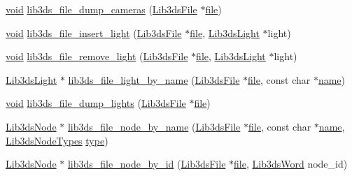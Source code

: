 \begin{DoxyCompactItemize}
\item 
\hyperlink{group___u_a_v_objects_plugin_ga444cf2ff3f0ecbe028adce838d373f5c}{void} \hyperlink{group__file_gaec85bcbf180366cd627e9ee90b9d6e53}{lib3ds\-\_\-file\-\_\-dump\-\_\-cameras} (\hyperlink{struct_lib3ds_file}{Lib3ds\-File} $\ast$\hyperlink{uavobjecttemplate_8m_a97c04efa65bcf0928abf9260bc5cbf46}{file})
\item 
\hyperlink{group___u_a_v_objects_plugin_ga444cf2ff3f0ecbe028adce838d373f5c}{void} \hyperlink{group__file_ga402b166af774fa3b07c6ae252d8699b6}{lib3ds\-\_\-file\-\_\-insert\-\_\-light} (\hyperlink{struct_lib3ds_file}{Lib3ds\-File} $\ast$\hyperlink{uavobjecttemplate_8m_a97c04efa65bcf0928abf9260bc5cbf46}{file}, \hyperlink{struct_lib3ds_light}{Lib3ds\-Light} $\ast$light)
\item 
\hyperlink{group___u_a_v_objects_plugin_ga444cf2ff3f0ecbe028adce838d373f5c}{void} \hyperlink{group__file_ga91923743db455cb6f8a31894b3cd3322}{lib3ds\-\_\-file\-\_\-remove\-\_\-light} (\hyperlink{struct_lib3ds_file}{Lib3ds\-File} $\ast$\hyperlink{uavobjecttemplate_8m_a97c04efa65bcf0928abf9260bc5cbf46}{file}, \hyperlink{struct_lib3ds_light}{Lib3ds\-Light} $\ast$light)
\item 
\hyperlink{struct_lib3ds_light}{Lib3ds\-Light} $\ast$ \hyperlink{group__file_gac0d864052ce4645b2561f7f4b5ee7b2c}{lib3ds\-\_\-file\-\_\-light\-\_\-by\-\_\-name} (\hyperlink{struct_lib3ds_file}{Lib3ds\-File} $\ast$\hyperlink{uavobjecttemplate_8m_a97c04efa65bcf0928abf9260bc5cbf46}{file}, const char $\ast$\hyperlink{glext_8h_ad977737dfc9a274a62741b9500c49a32}{name})
\item 
\hyperlink{group___u_a_v_objects_plugin_ga444cf2ff3f0ecbe028adce838d373f5c}{void} \hyperlink{group__file_ga30c0f8ba7c3d835f5fc4290af202a326}{lib3ds\-\_\-file\-\_\-dump\-\_\-lights} (\hyperlink{struct_lib3ds_file}{Lib3ds\-File} $\ast$\hyperlink{uavobjecttemplate_8m_a97c04efa65bcf0928abf9260bc5cbf46}{file})
\item 
\hyperlink{struct_lib3ds_node}{Lib3ds\-Node} $\ast$ \hyperlink{group__file_ga88762f86bcc75e0f0e28bddbbb094ede}{lib3ds\-\_\-file\-\_\-node\-\_\-by\-\_\-name} (\hyperlink{struct_lib3ds_file}{Lib3ds\-File} $\ast$\hyperlink{uavobjecttemplate_8m_a97c04efa65bcf0928abf9260bc5cbf46}{file}, const char $\ast$\hyperlink{glext_8h_ad977737dfc9a274a62741b9500c49a32}{name}, \hyperlink{types_8h_aa6e93328c39112c608d845f4e0c56143}{Lib3ds\-Node\-Types} \hyperlink{glext_8h_a7d05960f4f1c1b11f3177dc963a45d86}{type})
\item 
\hyperlink{struct_lib3ds_node}{Lib3ds\-Node} $\ast$ \hyperlink{group__file_gab4834df937d4787d678ba7ddcb4e8f09}{lib3ds\-\_\-file\-\_\-node\-\_\-by\-\_\-id} (\hyperlink{struct_lib3ds_file}{Lib3ds\-File} $\ast$\hyperlink{uavobjecttemplate_8m_a97c04efa65bcf0928abf9260bc5cbf46}{file}, \hyperlink{types_8h_a439f68d12f4ad080599044949e41dba1}{Lib3ds\-Word} node\-\_\-id)

\end{DoxyCompactItemize}
